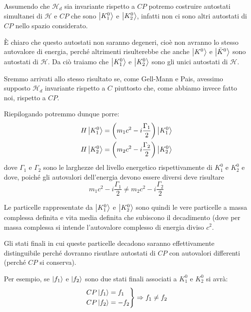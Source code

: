 Assumendo che $\mathcal{H}_d$ sia invariante rispetto a $CP$ potremo costruire
autostati simultanei di $\mathcal{H}$ e $CP$ che sono $\Ket{K_1^0}$ e
$\Ket{K_2^0}$, infatti non ci sono altri autostati di $CP$ nello spazio
considerato.

È chiaro che questo autostati non saranno degeneri, cioè non avranno lo stesso
autovalore di energia, perch\'e altrimenti risulterebbe che anche $\Ket{K^0}$
e $\Ket{\bar{K}^0}$ sono autostati di $\mathcal{H}$. Da ciò traiamo che $\Ket{K_1^0}$ e
$\Ket{K_2^0}$ sono gli unici autostati di $\mathcal{H}$.

Sremmo arrivati allo stesso risultato se, come Gell-Mann e Pais, avessimo
supposto $\mathcal{H}_d$ invariante rispetto a $C$ piuttosto che, come abbiamo
invece fatto noi, rispetto a $CP$.

Riepilogando potremmo dunque porre:
\begin{align}
  H\Ket{K_1^0} &= \left( m_1c^2 - i\frac{\Gamma_1}{2} \right)\Ket{K_1^0}\\
  H\Ket{K_2^0} &= \left( m_2c^2 - i\frac{\Gamma_2}{2} \right)\Ket{K_2^0}
\end{align}
dove $\Gamma_1$ e $\Gamma_2$ sono le larghezze del livello energetico
rispettivamente di $K_1^0$ e $K_2^0$ e dove, poich\'e gli autovalori
dell'energia devono essere diversi deve risultare
\[
  m_1c^2 - i\frac{\Gamma_1}{2}\neq m_2c^2 - i\frac{\Gamma_2}{2}
\]

Le particelle rappresentate da $\Ket{K_1^0}$ e $\Ket{K_2^0}$ sono quindi le vere
particelle a massa complessa definita e vita media definita che subiscono il
decadimento (dove per massa complessa si intende l'autovalore complesso di
energia diviso $c^2$.

Gli stati finali in cui queste particelle decadono saranno effettivamente
distinguibile perch\'e dovranno risutlare autostati di $CP$ con autovalori
differenti (perch\'e $CP$ si conserva).

Per esempio, se $\Ket{f_1}$ e $\Ket{f_2}$ sono due stati finali associati a
$K_1^0$ e $K_2^0$ si avrà:
\begin{equation*}
  \left.
  \begin{split}
    CP\Ket{f_1} &= f_1\\
	CP\Ket{f_2} &= -f_2
  \end{split}\right\rbrace
  \Rightarrow f_1\neq f_2
\end{equation*}

